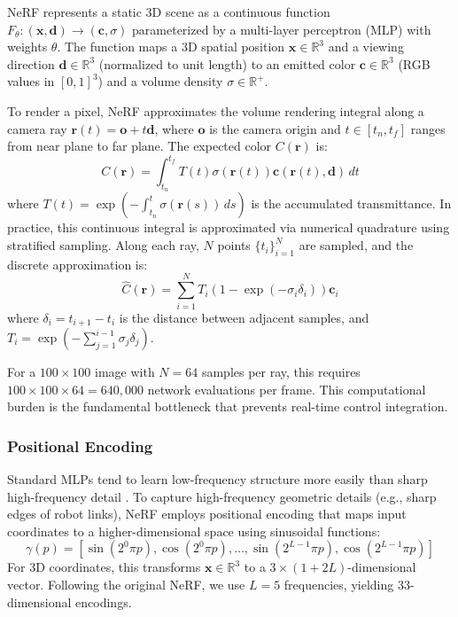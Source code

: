 \documentclass[12pt,a4paper,oneside]{report}
\begin{document}
NeRF represents a static 3D scene as a continuous function $F_\theta: (\mathbf{x}, \mathbf{d}) \rightarrow (\mathbf{c}, \sigma)$ parameterized by a multi-layer perceptron (MLP) with weights $\theta$. The function maps a 3D spatial position $\mathbf{x} \in \mathbb{R}^3$ and a viewing direction $\mathbf{d} \in \mathbb{R}^3$ (normalized to unit length) to an emitted color $\mathbf{c} \in \mathbb{R}^3$ (RGB values in $[0,1]^3$) and a volume density $\sigma \in \mathbb{R}^+$.

To render a pixel, NeRF approximates the volume rendering integral along a camera ray $\mathbf{r}(t) = \mathbf{o} + t\mathbf{d}$, where $\mathbf{o}$ is the camera origin and $t \in [t_n, t_f]$ ranges from near plane to far plane. The expected color $C(\mathbf{r})$ is:
\begin{equation}
C(\mathbf{r}) = \int_{t_n}^{t_f} T(t) \sigma(\mathbf{r}(t)) \mathbf{c}(\mathbf{r}(t), \mathbf{d}) \, dt
\end{equation}
where $T(t) = \exp\left(-\int_{t_n}^{t} \sigma(\mathbf{r}(s)) \, ds\right)$ is the accumulated transmittance. In practice, this continuous integral is approximated via numerical quadrature using stratified sampling. Along each ray, $N$ points $\{t_i\}_{i=1}^N$ are sampled, and the discrete approximation is:
\begin{equation}
\hat{C}(\mathbf{r}) = \sum_{i=1}^{N} T_i (1 - \exp(-\sigma_i \delta_i)) \mathbf{c}_i
\end{equation}
where $\delta_i = t_{i+1} - t_i$ is the distance between adjacent samples, and $T_i = \exp\left(-\sum_{j=1}^{i-1} \sigma_j \delta_j\right)$.

For a $100 \times 100$ image with $N = 64$ samples per ray, this requires $100 \times 100 \times 64 = 640,000$ network evaluations per frame. This computational burden is the fundamental bottleneck that prevents real-time control integration.

\subsubsection{Positional Encoding}

Standard MLPs tend to learn low-frequency structure more easily than sharp high-frequency detail \cite{rahaman2019spectral}. To capture high-frequency geometric details (e.g., sharp edges of robot links), NeRF employs positional encoding that maps input coordinates to a higher-dimensional space using sinusoidal functions:
\begin{equation}
\gamma(p) = [\sin(2^0 \pi p), \cos(2^0 \pi p), \ldots, \sin(2^{L-1} \pi p), \cos(2^{L-1} \pi p)]
\end{equation}
For 3D coordinates, this transforms $\mathbf{x} \in \mathbb{R}^3$ to a $3 \times (1 + 2L)$-dimensional vector. Following the original NeRF, we use $L = 5$ frequencies, yielding 33-dimensional encodings.
\end{document}
